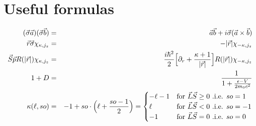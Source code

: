\documentclass[11pt,a4paper]{report}
\begin{document}
\chapter{Useful formulas}
\begin{eqnarray}
(\vec{\sigma}\vec{a})(\vec{\sigma}\vec{b})
&=&\vec{a}\vec{b}+i\vec{\sigma}(\vec{a}\times\vec{b})
\\
\vec{r}\vec{\sigma}\chi_{\kappa,j_z}&=&-|\vec{r}|\chi_{-\kappa,j_z}
\\
\vec{S}\vec{p}R(|\vec{r}|)\chi_{\kappa,j_z}
&=&\frac{i\hbar^2}{2}\Bigl[\partial_r+\frac{\kappa+1}{|\vec{r}|}\Bigr]
R(|\vec{r}|)\chi_{-\kappa,j_z}
\\
1+D&=&\frac{1}{1+\frac{\epsilon-V}{2m_0c^2}}
\\
\kappa(\ell,so)&=&-1+so\cdot\Bigl(\ell+\frac{so-1}{2}\Bigr)
=
\begin{cases}
-\ell-1&\text{for $\vec{L}\vec{S}\ge0$ .i.e. $so=1$ }\\
\ell&\text{for $\vec{L}\vec{S}<0$ .i.e. $so=-1$}\\
-1&\text{for $\vec{L}\vec{S}=0$ .i.e. $so=0$}\\
\end{cases}
\end{eqnarray}



\printindex


\end{document}
